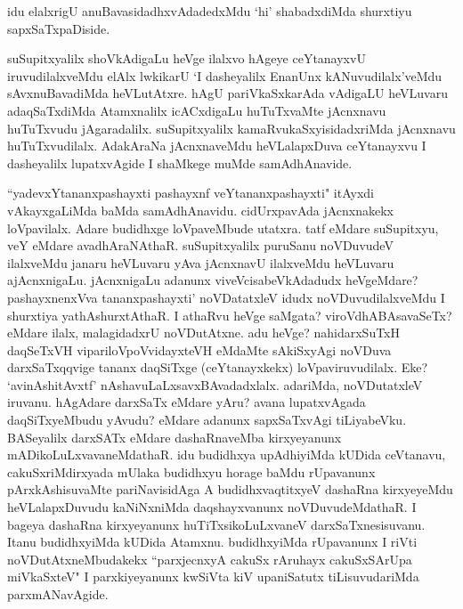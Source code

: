 \begin{artha}
idu elalxrigU anuBavasidadhxvAdadedxMdu `hi' shabadxdiMda shurxtiyu sapxSaTxpaDiside.
\end{artha}


\begin{artha}
suSupitxyalilx shoVkAdigaLu heVge ilalxvo hAgeye ceYtanayxvU iruvudilalxveMdu elAlx lwkikarU `I dasheyalilx EnanUnx kANuvudilalx'veMdu sAvxnuBavadiMda heVLutAtxre. hAgU pariVkaSxkarAda vAdigaLU heVLuvaru adaqSaTxdiMda Atamxnalilx icACxdigaLu huTuTxvaMte jAcnxnavu huTuTxvudu jAgaradalilx. suSupitxyalilx kamaRvukaSxyisidadxriMda jAcnxnavu huTuTxvudilalx. AdakAraNa jAcnxnaveMdu heVLalapxDuva ceYtanayxvu I dasheyalilx lupatxvAgide I shaMkege muMde samAdhAnavide. 
\end{artha}

\begin{artha}
``yadevxYtananxpashayxti pashayxnf veYtananxpashayxti" itAyxdi vAkayxgaLiMda baMda samAdhAnavidu. cidUrxpavAda jAcnxnakekx loVpavilalx. Adare budidhxge loVpaveMbude utatxra. tatf eMdare suSupitxyu, veY eMdare avadhAraNAthaR. suSupitxyalilx puruSanu noVDuvudeV ilalxveMdu janaru heVLuvaru yAva jAcnxnavU ilalxveMdu heVLuvaru ajAcnxnigaLu. jAcnxnigaLu adanunx viveVcisabeVkAdadudx heVgeMdare? pashayxnenxVva tananxpashayxti' noVDatatxleV idudx noVDuvudilalxveMdu I shurxtiya yathAshurxtAthaR. I athaRvu heVge saMgata? viroVdhABAsavaSeTx? eMdare ilalx, malagidadxrU noVDutAtxne. adu heVge? nahidarxSuTxH daqSeTxVH vipariloVpoVvidayxteVH eMdaMte sAkiSxyAgi noVDuva darxSaTxqqvige tananx daqSiTxge (ceYtanayxkekx) loVpaviruvudilalx. Eke? `avinAshitAvxtf' nAshavuLaLxsavxBAvadadxlalx. adariMda, noVDutatxleV iruvanu. hAgAdare darxSaTx eMdare yAru? avana lupatxvAgada daqSiTxyeMbudu yAvudu? eMdare adanunx sapxSaTxvAgi tiLiyabeVku. BASeyalilx darxSATx eMdare dashaRnaveMba kirxyeyanunx mADikoLuLxvavaneMdathaR. idu budidhxya upAdhiyiMda kUDida ceVtanavu, cakuSxriMdirxyada mUlaka budidhxyu horage baMdu rUpavanunx pArxkAshisuvaMte pariNavisidAga A budidhxvaqtitxyeV dashaRna kirxyeyeMdu heVLalapxDuvudu kaNiNxniMda daqshayxvanunx noVDuvudeMdathaR. I bageya dashaRna kirxyeyanunx huTiTxsikoLuLxvaneV darxSaTxnesisuvanu. Itanu budidhxyiMda kUDida Atamxnu. budidhxyiMda rUpavanunx I riVti noVDutAtxneMbudakekx ``parxjecnxyA cakuSx rAruhayx cakuSxSArUpa miVkaSxteV" I parxkiyeyanunx kwSiVta kiV upaniSatutx tiLisuvudariMda parxmANavAgide. 
\end{artha}%

